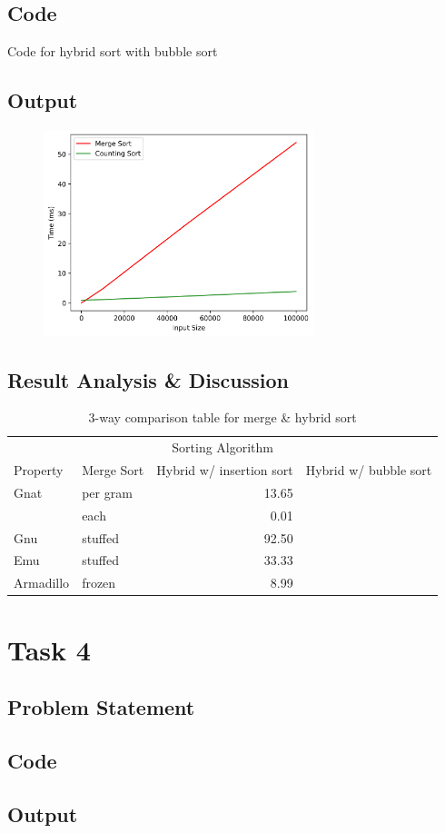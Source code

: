 \subsection{Code}
\begin{code}
    \label{code:bubble}
    \caption{Code for hybrid sort with bubble sort}
\end{code}
\subsection{Output}
\begin{figure}[H]
    \centering
    \includegraphics[width=0.7\textwidth]{task1_merge_count.png}
\end{figure}
\subsection{Result Analysis \& Discussion}

\begin{table}[H]
    \centering
    \caption{3-way comparison table for merge \& hybrid sort}
    \label{tab:comp}
\begin{tabular}{llrr}
    \toprule
    \multicolumn{4}{c}{Sorting Algorithm} \\
    \cmidrule(r){2-4}
    Property & Merge Sort & Hybrid w/ insertion sort & Hybrid w/ bubble sort \\
    \midrule
    Gnat & per gram & 13.65 \\
    & each & 0.01 \\
    Gnu & stuffed & 92.50 \\
    Emu & stuffed & 33.33 \\
    Armadillo & frozen & 8.99 \\
    \bottomrule
\end{tabular}
\end{table}

\section{Task 4}
\subsection{Problem Statement}

\subsection{Code}
\begin{code}
    
\end{code}

\subsection{Output}

